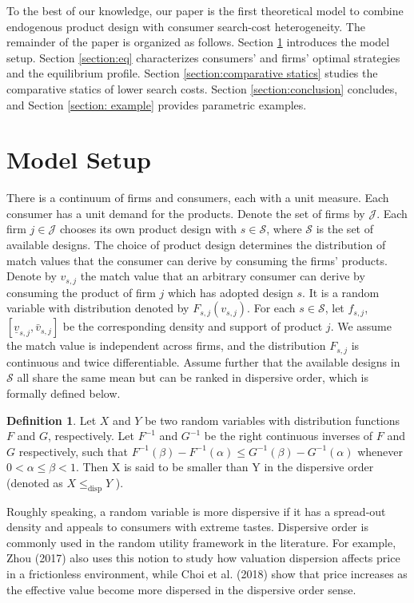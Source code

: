 \documentclass[14pt]{article}
\theoremstyle{plain}
\theoremstyle{definition}
\newtheorem{defn}{Definition}[section]
\theoremstyle{remark}
\DeclareRobustCommand\1{\futurelet\oneNext\oneCheck}
\begin{document}
To the best of our knowledge, our paper is the first theoretical model to combine endogenous product design with consumer search-cost heterogeneity. The remainder of the paper is organized as follows. Section \ref{section:setup} introduces the model setup. Section \ref{section:eq} characterizes consumers' and firms' optimal strategies and the equilibrium profile. Section \ref{section:comparative statics} studies the comparative statics of lower search costs. Section \ref{section:conclusion} concludes, and Section \ref{section: example} provides parametric examples. 


\section{Model Setup}\label{section:setup}

There is a continuum of firms and consumers, each with a unit measure. Each consumer has a unit demand for the products. Denote the set of firms by $\mathcal{J}$. Each firm $j\in \mathcal{J}$ chooses its own product design with $s\in \mathcal{S}$, where $\mathcal{S}$ is the set of available designs. The choice of product design determines the distribution of match values that the consumer can derive by consuming the firms' products. Denote by $v_{s,j}$ the match value that an arbitrary consumer can derive by consuming the product of firm $j$ which has adopted design $s$. It is a random variable with distribution denoted by $F_{s,j}(v_{s,j})$. For each $s\in \mathcal{S}$, let $f_{s,j}$, $[\underline{v}_{s,j}, \bar{v}_{s,j}]$ be the corresponding density and support of product $j$. We assume the match value is independent across firms, and the distribution $F_{s,j}$ is continuous and twice differentiable. Assume further that the available designs in $\mathcal{S}$ all share the same mean but can be ranked in dispersive order, which is formally defined below.
\begin{defn}
Let $X$ and $Y$ be two random variables with distribution functions $F$ and $G$, respectively. Let $F^{-1}$ and $G^{-1}$ be the right continuous inverses of $F$ and $G$ respectively, such that
$F^{-1}(\beta) - F^{-1}(\alpha)\leq G^{-1}(\beta)-G^{-1}(\alpha)$ whenever $0<\alpha\leq \beta<1$. Then X is said to be smaller than Y in the dispersive order (denoted as $X\leq_{\text{disp}}Y$ ). 
\end{defn}

Roughly speaking, a random variable is more dispersive if it has a spread-out density and appeals to consumers with extreme tastes. Dispersive order is commonly used in the random utility framework in the literature. For example, Zhou (2017) also uses this notion to study how valuation dispersion affects price in a frictionless environment, while Choi et al. (2018) show that price increases as the effective value become more dispersed in the dispersive order sense. 
\end{document}
